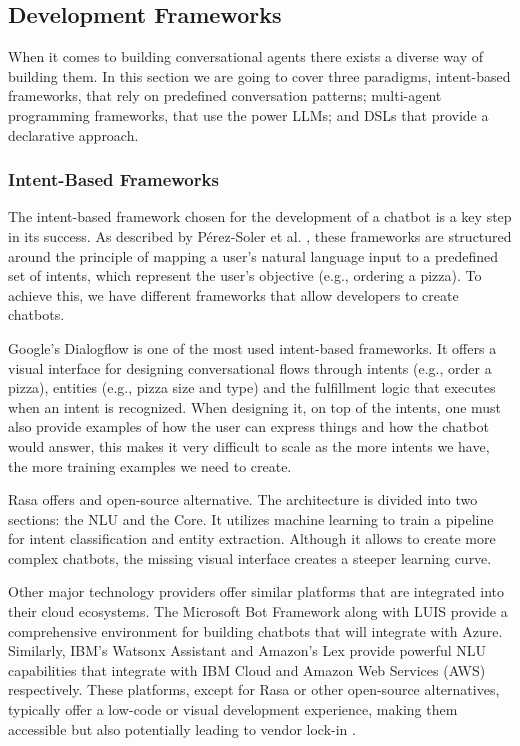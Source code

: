 \subsection{Development Frameworks}

When it comes to building conversational agents
there exists a diverse way of building them.
In this section we are going to cover three paradigms,
intent-based frameworks, that rely on predefined conversation patterns;
multi-agent programming frameworks, that use the power \acp{LLM};
and \aclp{DSL} that provide a declarative approach.

\subsubsection{Intent-Based Frameworks}

The intent-based framework chosen for the development of a chatbot
is a key step in its success.
As described by Pérez-Soler et al. \autocite{perez-solerChoosingChatbotDevelopment2021},
these frameworks are structured around the principle of
mapping a user's natural language input
to a predefined set of intents,
which represent the user's objective (e.g., ordering a pizza).
To achieve this, we have different frameworks
that allow developers to create chatbots.

Google's Dialogflow \autocite{Dialogflow}
is one of the most used intent-based frameworks.
It offers a visual interface
for designing conversational flows
through intents (e.g., order a pizza),
entities (e.g., pizza size and type)
and the fulfillment logic that executes when an intent is recognized.
When designing it, on top of the intents,
one must also provide examples of how the user can express things
and how the chatbot would answer,
this makes it very difficult to scale
as the more intents we have,
the more training examples we need to create.

Rasa \autocite{Rasa2020} offers and open-source \autocite{RasaHQRasa2025} alternative.
The architecture is divided into two sections:
the \ac{NLU} and the Core.
It utilizes machine learning to train a pipeline
for intent classification and entity extraction.
Although it allows to create more complex chatbots,
the missing visual interface creates a steeper learning curve.

Other major technology providers offer similar platforms
that are integrated into their cloud ecosystems.
The Microsoft Bot Framework \autocite{MicrosoftBotFramework}
along with \ac{LUIS} \autocite{LUISLanguageUnderstanding}
provide a comprehensive environment
for building chatbots that will integrate with Azure.
Similarly, IBM's Watsonx Assistant \autocite{IBMWatsonxAssistant2025}
and Amazon's Lex \autocite{AmazonLex}
provide powerful \ac{NLU} capabilities that integrate
with IBM Cloud and Amazon Web Services (AWS) respectively.
These platforms, except for Rasa or other open-source alternatives,
typically offer a low-code or visual development experience,
making them accessible but also potentially leading to vendor lock-in \autocite{perez-solerChoosingChatbotDevelopment2021}.


